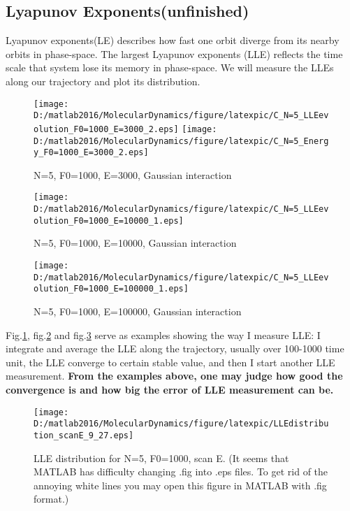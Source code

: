 \documentclass[aps,pre,twocolumn
,groupedaddress]{revtex4-1}
\begin{document}
\newpage
\subsection{Lyapunov Exponents(unfinished)}
Lyapunov exponents(LE) describes how fast one orbit diverge from its nearby orbits in phase-space. The largest Lyapunov exponents (LLE) reflects  the time scale that system lose its memory in phase-space. We will measure the LLEs along our trajectory and plot its distribution.

\begin{figure}[hbtp]
\centering
\texttt{[image: D:/matlab2016/MolecularDynamics/figure/latexpic/C\_N=5\_LLEevolution\_F0=1000\_E=3000\_2.eps]}
\texttt{[image: D:/matlab2016/MolecularDynamics/figure/latexpic/C\_N=5\_Energy\_F0=1000\_E=3000\_2.eps]} 
\caption{N=5, F0=1000, E=3000, Gaussian interaction}
\label{fig:LLEexample1}
\end{figure}
\begin{figure}[hbtp]
\centering
\texttt{[image: D:/matlab2016/MolecularDynamics/figure/latexpic/C\_N=5\_LLEevolution\_F0=1000\_E=10000\_1.eps]}
\caption{N=5, F0=1000, E=10000, Gaussian interaction}
\label{fig:LLEexample2}
\end{figure}
\begin{figure}[hbtp]
\centering
\texttt{[image: D:/matlab2016/MolecularDynamics/figure/latexpic/C\_N=5\_LLEevolution\_F0=1000\_E=100000\_1.eps]}
\caption{N=5, F0=1000, E=100000, Gaussian interaction}
\label{fig:LLEexample3}
\end{figure}

Fig.\ref{fig:LLEexample1}, fig.\ref{fig:LLEexample2} and fig.\ref{fig:LLEexample3} serve as examples showing the way I measure LLE: I integrate and average the LLE along the trajectory, usually over 100-1000 time unit, the LLE converge to certain stable value, and then I start another LLE measurement. \textbf{From the examples above, one may judge how good the convergence is and how big the error of LLE measurement can be.}


\begin{figure}[hbtp]
\centering
\texttt{[image: D:/matlab2016/MolecularDynamics/figure/latexpic/LLEdistribution\_scanE\_9\_27.eps]}
\caption{LLE distribution for N=5, F0=1000, scan E. (It seems that MATLAB has difficulty changing .fig into .eps files. To get rid of the annoying white lines you may open this figure in MATLAB with .fig format.)}
\label{fig:LLEdistribution1}
\end{figure}
\end{document}
